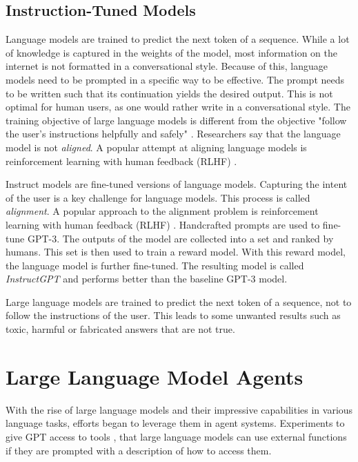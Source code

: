 \documentclass[../main.tex]{subfiles}
\begin{document}
\subsection{Instruction-Tuned Models}

Language models are trained to predict the next token of a sequence.
While a lot of knowledge is captured in the weights of the model,
most information on the internet is not formatted in a conversational style.
Because of this, language models need to be prompted in a specific way to be effective.
The prompt needs to be written such that its continuation yields the desired output.
This is not optimal for human users, as one would rather write in a conversational style.
The training objective of large language models is different from the objective
"follow the user's instructions helpfully and safely" \cite{Ouyang2022}.
Researchers say that the language model is not \emph{aligned}.
A popular attempt at aligning language models is reinforcement learning with human feedback (RLHF) \cite{Ouyang2022}.


Instruct models are fine-tuned versions of language models.
Capturing the intent of the user is a key challenge for language models.
This process is called \emph{alignment}.
A popular approach to the alignment problem is reinforcement learning with human feedback (RLHF) \cite{Ouyang2022}.
Handcrafted prompts are used to fine-tune GPT-3.
The outputs of the model are collected into a set and ranked by humans.
This set is then used to train a reward model.
With this reward model, the language model is further fine-tuned.
The resulting model is called \emph{InstructGPT} and performs better than the baseline GPT-3 model.

Large language models are trained to predict the next token of a sequence,
not to follow the instructions of the user.
This leads to some unwanted results such as toxic, harmful or fabricated answers that are not true.

\section{Large Language Model Agents}
\label{sec:llm_agents}
With the rise of large language models and their impressive capabilities in various language tasks,
efforts began to leverage them in agent systems.
Experiments to give GPT access to tools \autocite{Shen2023, Schick2023},
that large language models can use external functions
if they are prompted with a description of how to access them.
\end{document}
